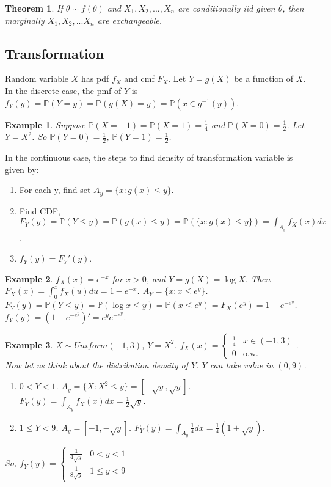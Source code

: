 \documentclass[11pt]{article}
\def\BP{{\bf P}}
\def\BP{{\mathbb P}}
\newtheorem{theorem}{Theorem}[section]
\newtheorem{example}{Example}[section]
\begin{document}
\begin{theorem}
If $\theta \sim f(\theta)$ and $X_1, X_2, ..., X_n$ are conditionally iid given $\theta$, then marginally $X_1, X_2, ... X_n$ are exchangeable.
\end{theorem}

\subsection{Transformation}
Random variable $X$ has pdf $f_X$ and cmf $F_X$. Let $Y = g(X)$ be a function of $X$. In the discrete case, the pmf of $Y$ is $f_Y(y) = \BP(Y = y) = \BP(g(X) = y) = \BP(x \in g^{-1}(y))$.

\begin{example}
Suppose $\BP(X=-1) = \BP(X=1) = \frac{1}{4}$ and $\BP(X=0) = \frac{1}{2}$. Let $Y=X^2$. So $\BP(Y=0) = \frac{1}{2}$, $\BP(Y=1)=\frac{1}{2}$.
\end{example}

In the continuous case, the steps to find density of transformation variable is given by:
\begin{enumerate}
\item For each y, find set $A_y = \{x:g(x) \leq y\}$.
\item Find CDF, $F_Y(y) = \BP(Y \leq y) = \BP(g(x) \leq y) = \BP(\{x: g(x)\leq y\}) = \int_{A_y} f_X(x) dx$.
\item $f_Y(y) = F_Y'(y)$.
\end{enumerate}

\begin{example}
  $f_X(x) = e^{-x}$ for $x>0$, and $Y=g(X)=\log X$. Then $F_X(x) = \int_0^x f_X(u) du = 1 - e^{-x}$. $A_Y = \{x: x \leq e^y\}$. $F_Y(y) = \BP(Y \leq y) = \BP(\log x \leq y) = \BP(x \leq e^y) = F_X(e^y) = 1 - e^{-e^y}$. $f_Y(y) = (1 - e^{-e^y})' = e^y e^{-e^y}$.
\end{example}

\begin{example}
  $X \sim Uniform(-1, 3)$, $Y=X^2$. $f_X(x) = \begin{cases}\frac{1}{4} & x\in(-1,3) \\ 0 & \text{o.w.}\end{cases}$. Now let us think about the distribution density of $Y$. $Y$ can take value in $(0, 9)$. 
  \begin{enumerate}
    \item $0 < Y < 1$. $A_y = \{X : X^2 \leq y\} = [-\sqrt{y}, \sqrt{y}]$. $F_Y(y) = \int_{A_y} f_X(x) dx = \frac{1}{2} \sqrt{y}$.
    \item $1 \leq Y < 9$. $A_y = [-1, -\sqrt{y}]$. $F_Y(y) = \int_{A_y} \frac{1}{4} dx = \frac{1}{4}(1 + \sqrt{y})$. 
  \end{enumerate}
  So, $f_Y(y) = \begin{cases} \frac{1}{4\sqrt{y}}  & 0 < y < 1 \\ \frac{1}{8\sqrt{y}}  & 1 \leq y < 9\end{cases}$
\end{example}
\end{document}
